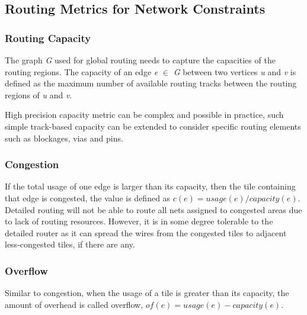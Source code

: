 \subsection{Routing Metrics for Network Constraints}
\subsubsection{Routing Capacity}
The graph \emph{G} used for global routing needs to capture the capacities of the routing regions. The capacity of an edge \emph{e} $\in$ \emph{G} between two vertices \emph{u} and \emph{v} is defined as the maximum number of available routing tracks between the routing regions of \emph{u} and \emph{v}. 

High precision capacity metric can be complex and possible in practice, such simple track-based capacity can be extended  to consider specific routing elements such as blockages, vias and pins.
\subsubsection{Congestion}
If the total usage of one edge is larger than its capacity, then the tile containing that edge is congested, the value is defined as $c(e)=usage(e)/capacity(e)$. Detailed routing will not be able to route all nets assigned to congested areas due to lack of routing resources. However, it is in some degree tolerable to the detailed router as it can spread the wires from the congested tiles to adjacent less-congested tiles, if there are any.
\subsubsection{Overflow}
Similar to congestion, when the usage of a tile is greater than its capacity, the amount of overhead is called overflow, $of(e)=usage(e)-capacity(e)$.


